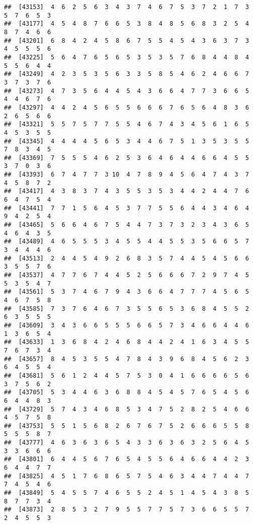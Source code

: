 \documentclass[
]{book}
\begin{document}
\begin{verbatim}
##  [43153]  4  6  2  5  6  3  4  3  7  4  6  7  5  3  7  2  1  7  3  5  7  6  5  3
##  [43177]  4  5  4  8  7  6  6  5  3  8  4  8  5  6  8  3  2  5  4  8  7  4  6  6
##  [43201]  6  8  4  2  4  5  8  6  7  5  5  4  5  4  3  6  3  7  3  4  5  5  5  6
##  [43225]  5  6  4  7  6  5  6  5  3  5  3  5  7  6  8  4  4  8  4  5  5  6  4  4
##  [43249]  4  2  3  5  3  5  6  3  3  5  8  5  4  6  2  4  6  6  7  3  7  3  7  6
##  [43273]  4  7  3  5  6  4  4  5  4  3  6  6  4  7  7  3  6  6  5  4  4  6  7  6
##  [43297]  4  4  2  4  5  6  5  5  6  6  6  7  6  5  6  4  8  3  6  2  6  5  6  6
##  [43321]  5  5  7  5  7  7  5  5  4  6  7  4  3  4  5  6  1  6  5  4  5  3  5  5
##  [43345]  4  4  4  4  5  6  5  3  4  4  6  7  5  1  3  5  3  5  5  7  8  3  4  5
##  [43369]  7  5  5  5  4  6  2  5  3  6  4  6  4  4  6  6  4  5  5  3  7  0  3  6
##  [43393]  6  7  4  7  7  3 10  4  7  8  9  4  5  6  4  7  4  3  7  4  5  8  7  2
##  [43417]  4  3  8  3  7  4  3  5  5  3  5  3  4  4  2  4  4  7  6  6  4  7  5  4
##  [43441]  7  7  1  5  6  4  5  3  7  7  5  5  6  4  4  3  4  6  4  9  4  2  5  4
##  [43465]  5  6  6  4  6  7  5  4  4  7  3  7  3  2  3  4  3  6  5  4  6  4  3  5
##  [43489]  4  6  5  5  5  3  4  5  5  4  4  5  5  3  5  6  6  5  7  3  4  4  4  6
##  [43513]  2  4  4  5  4  9  2  6  8  3  5  7  4  4  5  4  5  6  6  3  5  5  7  6
##  [43537]  4  7  7  6  7  4  4  5  2  5  6  6  6  7  2  9  7  4  5  5  3  5  4  7
##  [43561]  5  3  7  4  6  7  9  4  3  6  6  4  7  7  7  4  5  6  5  4  6  7  5  8
##  [43585]  7  3  7  6  4  6  7  3  5  5  6  5  3  6  8  4  5  5  2  6  3  5  5  5
##  [43609]  3  4  3  6  6  5  5  5  6  6  5  7  3  4  6  6  4  4  6  1  3  6  5  4
##  [43633]  1  3  6  8  4  2  4  6  8  4  4  2  4  1  6  3  4  5  5  7  6  7  3  4
##  [43657]  8  4  5  3  5  5  4  7  8  4  3  9  6  8  4  5  6  2  3  6  4  5  5  4
##  [43681]  5  6  1  2  4  4  5  7  5  3  0  4  1  6  6  6  6  5  6  3  7  5  6  2
##  [43705]  5  3  4  4  6  3  6  8  8  4  5  4  5  7  6  5  4  5  6  6  4  4  8  3
##  [43729]  5  7  4  3  4  6  8  5  3  4  7  5  2  8  2  5  4  6  6  4  5  7  5  8
##  [43753]  5  5  1  5  6  8  2  6  7  6  7  5  2  6  6  6  5  5  8  5  5  5  8  7
##  [43777]  4  6  3  6  3  6  5  4  3  3  6  3  6  3  2  5  6  4  5  3  3  6  6  6
##  [43801]  6  4  4  5  6  7  6  5  4  5  5  6  4  6  6  4  4  2  3  6  4  4  7  7
##  [43825]  4  5  1  7  6  8  6  5  7  5  4  6  3  4  4  7  4  4  7  7  4  5  4  6
##  [43849]  5  4  5  5  7  4  6  5  5  2  4  5  1  4  5  4  3  8  5  8  7  7  3  4
##  [43873]  2  8  5  3  2  7  9  5  5  7  7  5  7  3  6  6  5  5  7  2  4  5  5  3

\end{verbatim}
\end{document}
